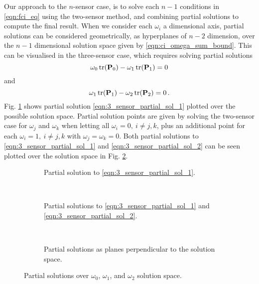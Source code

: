 \documentclass[letterpaper, 10 pt, conference]{ieeeconf}  %
\begin{document}
Our approach to the $n$-sensor case, is to solve each $n-1$ conditions in \eqref{eqn:fci_eq} using the two-sensor method, and combining partial solutions to compute the final result. When we consider each $\omega_i$ a dimensional axis, partial solutions can be considered geometrically, as hyperplanes of $n-2$ dimension, over the $n-1$ dimensional solution space given by \eqref{eqn:ci_omega_sum_bound}. This can be visualised in the three-sensor case, which requires solving partial solutions
\begin{equation}
   \omega_0 \operatorname{tr}({{\mathbf{P}}}_0) - \omega_1 \operatorname{tr}({{\mathbf{P}}}_1) = 0 \label{eqn:3_sensor_partial_sol_1}
\end{equation}
and
\begin{equation}
   \omega_1 \operatorname{tr}({{\mathbf{P}}}_1) - \omega_2 \operatorname{tr}({{\mathbf{P}}}_2) = 0\,. \label{eqn:3_sensor_partial_sol_2}
\end{equation}
Fig. \ref{fig:3_sensor_partial_sol} shows partial solution \eqref{eqn:3_sensor_partial_sol_1} plotted over the possible solution space. Partial solution points are given by solving the two-sensor case for $\omega_j$ and $\omega_k$ when letting all $\omega_i=0,\ i\neq j,k$, plus an additional point for each $\omega_i=1,\ i\neq j,k$ with $\omega_j=\omega_k=0$. Both partial solutions to \eqref{eqn:3_sensor_partial_sol_1} and \eqref{eqn:3_sensor_partial_sol_2} can be seen plotted over the solution space in Fig. \ref{fig:3_sensor_partial_sols}.
\begin{figure*}[tb]
   \begin{subfigure}[t]{0.3\textwidth}
      \begin{center}
         
      \end{center}
      \caption{Partial solution to \eqref{eqn:3_sensor_partial_sol_1}.}
      \label{fig:3_sensor_partial_sol}
   \end{subfigure}
   ~
   \begin{subfigure}[t]{0.3\textwidth}
      \begin{center}
         
      \end{center}
      \caption{Partial solutions to \eqref{eqn:3_sensor_partial_sol_1} and \eqref{eqn:3_sensor_partial_sol_2}.}
      \label{fig:3_sensor_partial_sols}
   \end{subfigure}
   ~
   \begin{subfigure}[t]{0.3\textwidth}
      \begin{center}
         
      \end{center}
      \caption{Partial solutions as planes perpendicular to the solution space.}
      \label{fig:3sen_planes}
   \end{subfigure}
   \caption{Partial solutions over $\omega_0$, $\omega_1$, and $\omega_2$ solution space.}
   \label{fig:partial_sols_and_planes}
\end{figure*}
\end{document}
